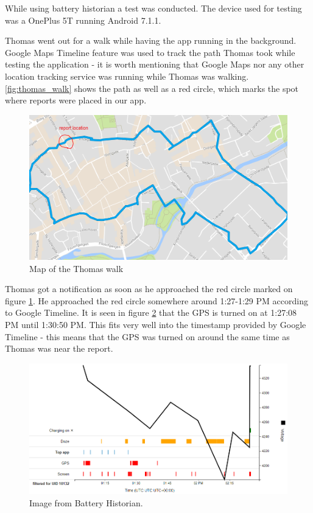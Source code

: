 While using battery historian a test was conducted. The device used for testing was a OnePlus 5T running Android 7.1.1. 

Thomas went out for a walk while having the app running in the background. Google Maps Timeline feature was used to track the path Thomas took while testing the application - it is worth mentioning that Google Maps nor any other location tracking service was running while Thomas was walking. \autoref{fig:thomas_walk} shows the path as well as a red circle, which marks the spot where reports were placed in our app.

\begin{figure}[H]
\centering
\includegraphics[width=.85\linewidth]{images/thomas_walk}
\caption{Map of the Thomas walk}
\label{fig:thomas_walk}
\end{figure}


Thomas got a notification as soon as he approached the red circle marked on figure \ref{fig:thomas_walk}. He approached the red circle somewhere around 1:27-1:29 PM according to Google Timeline. It is seen in figure \ref{fig:battery_stats_1} that the GPS is turned on at 1:27:08 PM until 1:30:50 PM. This fits very well into the timestamp provided by Google Timeline - this means that the GPS was turned on around the same time as Thomas was near the report.

\begin{figure}[H]
\centering
\includegraphics[width=\linewidth]{images/battery_hist}
\caption{Image from Battery Historian.} 
\label{fig:battery_stats_1}
\end{figure}

